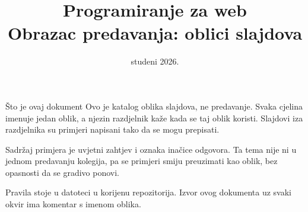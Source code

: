 %
%
%
%



\title[Obrazac predavanja]{Programiranje za web \\ Obrazac predavanja: oblici slajdova}
\date{studeni 2026.}



\frame{\titlepage}

\begin{frame}{Što je ovaj dokument}
Ovo je katalog oblika slajdova, ne predavanje. Svaka cjelina imenuje jedan oblik, a njezin razdjelnik kaže kada se taj oblik koristi. Slajdovi iza razdjelnika su primjeri napisani tako da se mogu prepisati.

\vspace{0.9em}
Sadržaj primjera je uvjetni zahtjev i oznaka inačice odgovora. Ta tema nije ni u jednom predavanju kolegija, pa se primjeri smiju preuzimati kao oblik, bez opasnosti da se gradivo ponovi.

\vspace{0.9em}
Pravila stoje u datoteci  u korijenu repozitorija. Izvor ovog dokumenta uz svaki okvir ima komentar s imenom oblika.
\end{frame}


